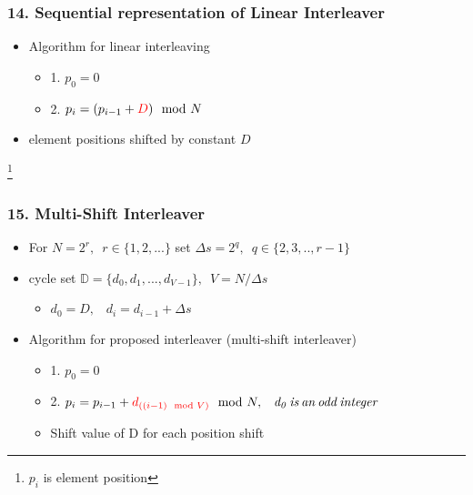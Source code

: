 \documentclass{beamer}  %
\newcommand\blfootnote[1]{%
  \begingroup
  \renewcommand\thefootnote{}\footnote{#1}%
  \addtocounter{footnote}{-1}%
  \endgroup
}
\begin{document}
\begin{frame}
\frametitle{14. Sequential representation of Linear Interleaver}

\begin{itemize}
\setlength\itemsep{2em}


 \item Algorithm for linear interleaving



\begin{itemize}
\setlength\itemsep{1.5em}
\item 1. $p_0=0$
 
\item 2. $p_i=(p_{i-1}+\textcolor{red}{D}) \mod N$

\end{itemize}



\item element positions shifted  by constant $D$
\end{itemize}

\blfootnote{$p_i$ is element position}
\end{frame}
\begin{frame}
\frametitle{15. Multi-Shift Interleaver}

\begin{itemize}
\setlength\itemsep{1.5em}



\item For $N=2^r,\,\,\, r\in \{ 1,2,...\}$ set $\Delta s= 2^q, \,\,\, q\in\{2,3,..,r-1\}$

\item cycle set $\mathbb{D}=\{d_0,d_1,...,d_{V-1}\},\,\,\, V=N/\Delta s$
\begin{itemize}
\item $ d_0 =D, \,\,\,\,\, d_i=d_{i-1}+\Delta s $
\end{itemize}

\item Algorithm for proposed interleaver (multi-shift interleaver)

\begin{itemize}
\item 1. $p_0=0$
 
 \item 2. $p_i=p_{i-1}+\textcolor{red}{d_{((i-1) \mod V) } }\mod N,\,\,\,\,\,  \mathit{d_0 \,is \,an \,odd \,integer}$

\item Shift value of D for each position shift
\end{itemize}






\end{itemize}


\end{frame}
\end{document}
